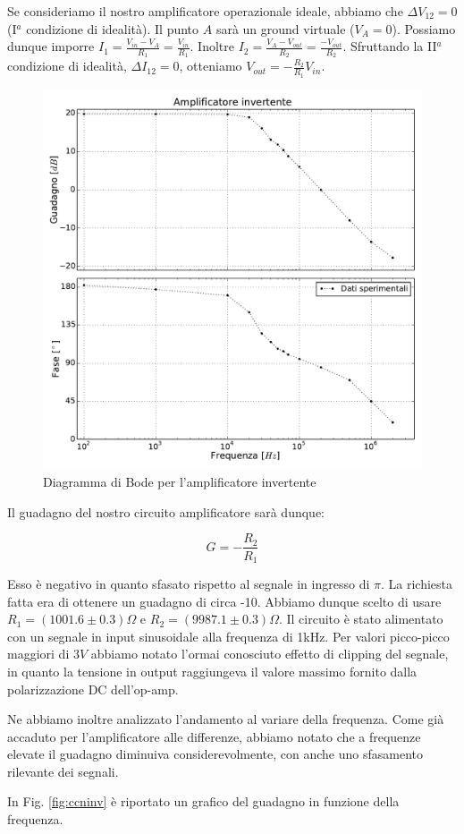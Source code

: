 Se consideriamo il nostro amplificatore operazionale ideale, abbiamo che $\Delta V_{12}=0$ (I$^a$ condizione di idealità).
Il punto $A$ sarà un ground virtuale ($V_A = 0$).
Possiamo dunque imporre $I_1=\frac{V_{in}-V_A}{R_1}=\frac{V_{in}}{R_1}$.
Inoltre $I_2=\frac{V_A-V_{out}}{R_2}=\frac{-V_{out}}{R_2}$.
Sfruttando la II$^a$ condizione di idealità, $\Delta I_{12}=0$, otteniamo $V_{out}=-\frac{R_2}{R_1} V_{in}$.

\begin{figure}
			\includegraphics[width=.48\textwidth]{b_inv.pdf}
			\caption{Diagramma di Bode per l'amplificatore invertente}
			\label{fig:invbode}
\end{figure}

Il guadagno del nostro circuito amplificatore sarà dunque:

\begin{equation}
G=-\frac{R_2}{R_1}
\end{equation}

Esso è negativo in quanto sfasato rispetto al segnale in ingresso di $\pi$.
La richiesta fatta era di ottenere un guadagno di circa -10.
Abbiamo dunque scelto di usare $R_1=(1001.6\pm0.3)\Omega$ e $R_2=(9987.1\pm0.3)\Omega$.
Il circuito è stato alimentato con un segnale in input sinusoidale alla frequenza di 1kHz.
Per valori picco-picco maggiori di $3V$ abbiamo notato l'ormai conosciuto effetto di clipping del segnale, in quanto la tensione in output raggiungeva il valore massimo fornito dalla polarizzazione DC dell'op-amp. 

Ne abbiamo inoltre analizzato l'andamento al variare della frequenza.
Come già accaduto per l'amplificatore alle differenze, abbiamo notato che a frequenze elevate il guadagno diminuiva considerevolmente, con anche uno sfasamento rilevante dei segnali.

In Fig. \ref{fig:ccninv} è riportato un grafico del guadagno in funzione della frequenza. 


